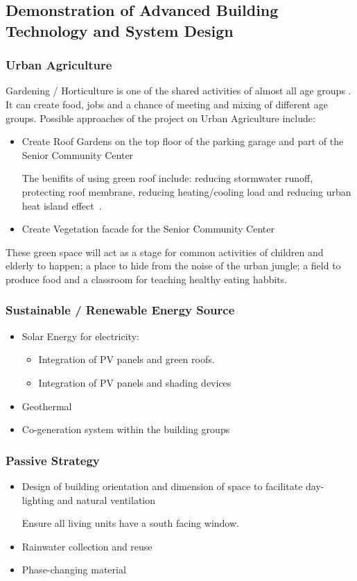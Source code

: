 \subsection{Demonstration of Advanced Building Technology and System
  Design}
\subsubsection{Urban Agriculture}
Gardening / Horticulture is one of the shared activities of almost all
age groups . It can create food, jobs and a chance of meeting and
mixing of different age groups. Possible approaches of the project on
Urban Agriculture include:
\begin{itemize}
\item Create Roof Gardens on the top floor of the parking garage and
  part of the Senior Community Center

The benifits of using green roof include: reducing stormwater runoff,
protecting roof membrane, reducing heating/cooling load and reducing
urban heat island effect~\cite{Snodgrass2010}.
\item Create Vegetation facade for the Senior Community Center
\end{itemize}
These green space will act as a stage for common activities of
children and elderly to happen; a place to hide from the noise of the
urban jungle; a field to produce food and a classroom for teaching
healthy eating habbits.

\subsubsection{Sustainable / Renewable Energy Source}
\begin{itemize}
\item Solar Energy for electricity: 
  \begin{itemize}
  \item Integration of PV panels and green roofs.
  \item Integration of PV panels and shading devices
  \end{itemize}
\item Geothermal
\item Co-generation system within the building groups
\end{itemize}
\subsubsection{Passive Strategy}
\begin{itemize}
\item Design of building orientation and dimension of space to
  facilitate day-lighting and natural ventilation

Ensure all living units have a south facing window.
\item Rainwater collection and reuse
\item Phase-changing material
\end{itemize}
